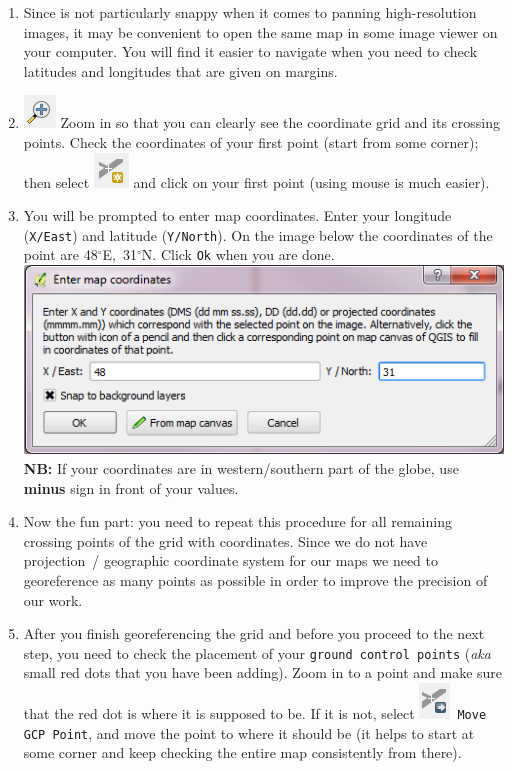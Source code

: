 \documentclass[12pt,oneside]{article}
\begin{document}
\begin{enumerate}
\item Since \QGIS is not particularly snappy when it comes to panning high-resolution images, it may be convenient to open the same map in some image viewer on your computer. You will find it easier to navigate when you need to check latitudes and longitudes that are given on margins.

\item \includegraphics[scale=.5]{qgis_g_zoomin} Zoom in so that you can clearly see the coordinate grid and its crossing points. Check the coordinates of your first point (start from some corner); then select \includegraphics[scale=.5]{qgis_g_addpoint} and click on your first point (using mouse is much easier).

\item You will be prompted to enter map coordinates. Enter your longitude (\texttt{X/East}) and latitude (\texttt{Y/North}). On the image below the coordinates of the point are 48$^{\circ}$E,~31$^{\circ}$N. Click \texttt{Ok} when you are done.\\
\includegraphics[scale=.5]{qgis_g_entermapcoordinates}\\
\textbf{NB:} If your coordinates are in western/southern part of the globe, use \textbf{minus} sign in front of your values.

\item Now the fun part: you need to repeat this procedure for all remaining crossing points of the grid with coordinates. Since we do not have projection~/ geographic coordinate system for our maps we need to georeference as many points as possible in order to improve the precision of our work.

\item After you finish georeferencing the grid and before you proceed to the next step, you need to check the placement of your \texttt{ground control points} (\textit{aka} small red dots that you have been adding). Zoom in to a point and make sure that the red dot is where it is supposed to be. If it is not, select \includegraphics[scale=.5]{qgis_g_movegcp}~\texttt{Move GCP Point}, and move the point to where it should be (it helps to start at some corner and keep checking the entire map consistently from there).


\end{enumerate}
\end{document}
